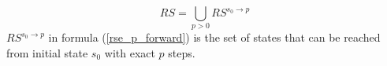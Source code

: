 \documentclass[journal]{IEEEtran}
\begin{document}
\begin{equation}\label{rse}
RS =\bigcup_{p>0} RS^{s_0\to p}
\end{equation}
%
%
%
%
%
%
$RS^{s_0\to p}$ in formula (\ref{rse_p_forward}) is the set of states that can be reached from initial state $s_0$ with exact $p$ steps.

\end{document}
